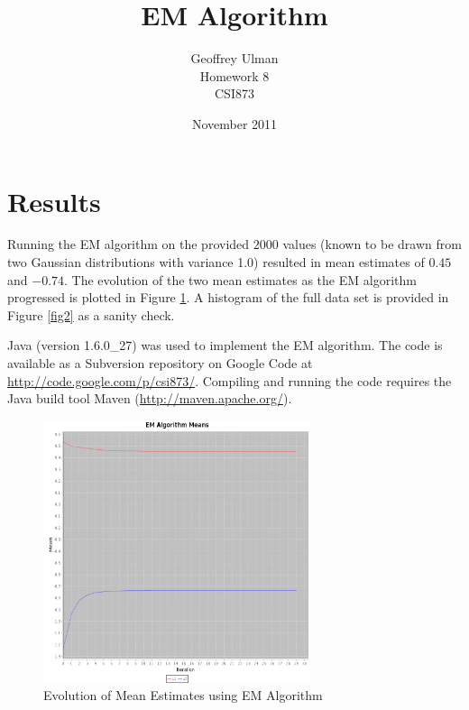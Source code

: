\documentclass{article}
\begin{document}
\title{EM Algorithm}
\author{Geoffrey Ulman\\
        Homework 8\\
        CSI873}
\date{November 2011}
\maketitle

\section{Results}\label{Results}

Running the EM algorithm on the provided \(2000\) values (known to be drawn from two Gaussian distributions with variance 1.0) resulted in mean estimates of \(0.45\) and \(-0.74\). The evolution of the two mean estimates as the EM algorithm progressed is plotted in Figure \ref{fig1}. A histogram of the full data set is provided in Figure \ref{fig2} as a sanity check.

Java (version 1.6.0\_27) was used to implement the EM algorithm. The code is available as a Subversion repository on Google Code at \url{http://code.google.com/p/csi873/}. Compiling and running the code requires the Java build tool Maven (\url{http://maven.apache.org/}).

\begin{figure}
\centering
\includegraphics[width=0.7\textwidth]{em-means.png}
\caption{Evolution of Mean Estimates using EM Algorithm}
\label{fig1}
\end{figure}
\end{document}
